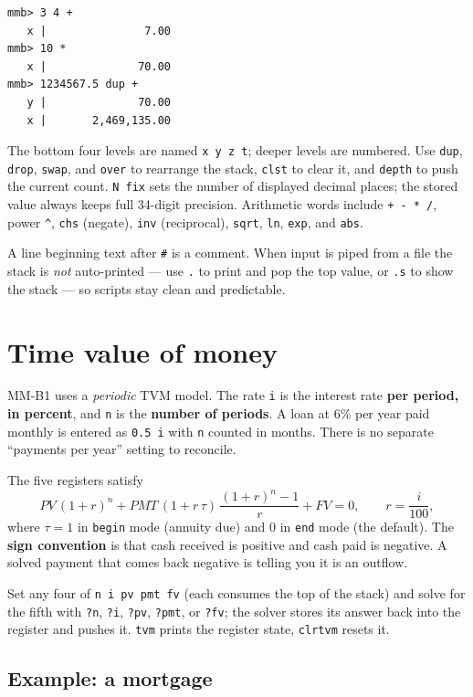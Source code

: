 \documentclass[11pt]{article}
\newcommand{\w}[1]{\texttt{#1}}
\begin{document}
\begin{lstlisting}
mmb> 3 4 +
   x |               7.00
mmb> 10 *
   x |              70.00
mmb> 1234567.5 dup +
   y |              70.00
   x |       2,469,135.00
\end{lstlisting}

The bottom four levels are named \w{x y z t}; deeper levels are numbered. Use
\w{dup}, \w{drop}, \w{swap}, and \w{over} to rearrange the stack, \w{clst} to
clear it, and \w{depth} to push the current count. \w{N fix} sets the number of
displayed decimal places; the stored value always keeps full 34-digit
precision. Arithmetic words include \w{+ - * /}, power \w{\^}, \w{chs}
(negate), \w{inv} (reciprocal), \w{sqrt}, \w{ln}, \w{exp}, and \w{abs}.

A line beginning text after \w{\#} is a comment. When input is piped from a
file the stack is \emph{not} auto-printed --- use \w{.} to print and pop the
top value, or \w{.s} to show the stack --- so scripts stay clean and
predictable.

\section{Time value of money}

MM-B1 uses a \emph{periodic} TVM model. The rate \w{i} is the interest rate
\textbf{per period, in percent}, and \w{n} is the \textbf{number of periods}.
A loan at 6\% per year paid monthly is entered as \w{0.5 i} with \w{n} counted
in months. There is no separate ``payments per year'' setting to reconcile.

The five registers satisfy
\[
\mathit{PV}\,(1+r)^n
+ \mathit{PMT}\,(1+r\,\tau)\,\frac{(1+r)^n-1}{r}
+ \mathit{FV} = 0, \qquad r=\frac{i}{100},
\]
where $\tau=1$ in \w{begin} mode (annuity due) and $0$ in \w{end} mode (the
default). The \textbf{sign convention} is that cash received is positive and
cash paid is negative. A solved payment that comes back negative is telling you
it is an outflow.

Set any four of \w{n i pv pmt fv} (each consumes the top of the stack) and
solve for the fifth with \w{?n}, \w{?i}, \w{?pv}, \w{?pmt}, or \w{?fv}; the
solver stores its answer back into the register and pushes it. \w{tvm} prints
the register state, \w{clrtvm} resets it.

\subsection{Example: a mortgage}
\end{document}
